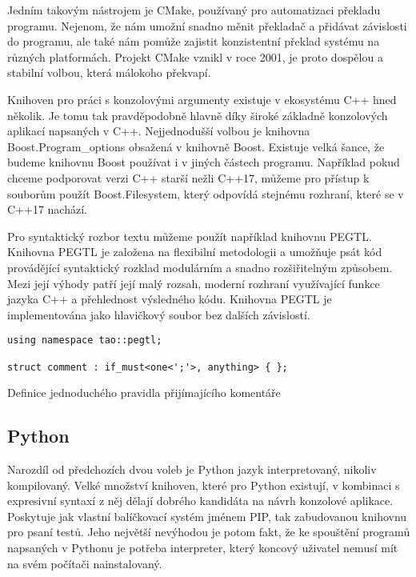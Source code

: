 Jedním takovým nástrojem je CMake\cite{cmake-overview}, používaný pro automatizaci překladu programu. Nejenom, že nám umožní snadno měnit překladač a přidávat závislosti do programu, ale také nám pomůže zajistit konzistentní překlad systému na různých platformách. Projekt CMake vznikl v roce 2001\cite{cmake-overview}, je proto dospělou a stabilní volbou, která málokoho překvapí.

Knihoven pro práci s konzolovými argumenty existuje v ekosystému C++ hned několik. Je tomu tak pravděpodobně hlavně díky široké základně konzolových aplikací napsaných v C++. Nejjednodušší volbou je knihovna Boost.Program\_options obsažená v knihovně Boost\cite{boost-filesystem}. Existuje velká šance, že budeme knihovnu Boost používat i v jiných částech programu. Například  pokud chceme podporovat verzi C++ starší nežli C++17\cite{cpp-filesystem}, můžeme pro přístup k souborům použít Boost.Filesystem, který odpovídá stejnému rozhraní, které se v C++17 nachází\cite{boost-filesystem}.

Pro syntaktický rozbor textu můžeme použít například knihovnu PEGTL\cite{github-pegtl}. Knihovna PEGTL je založena na flexibilní metodologii a umožňuje psát kód provádějící syntaktický rozklad modulárním a snadno rozšiřitelným způsobem. Mezi její výhody patří její malý rozsah, moderní rozhraní využívající funkce jazyka C++ a přehlednost výsledného kódu. Knihovna PEGTL je implementována jako hlavičkový soubor bez dalších závislostí\cite{github-pegtl}.

\begin{listing}
\begin{verbatim}
using namespace tao::pegtl;

struct comment : if_must<one<';'>, anything> { };
\end{verbatim}
\caption{Definice jednoduchého pravidla přijímajícího komentáře}
\label{fig:peg-example}
\end{listing}

\subsection{Python}

Narozdíl od předchozích dvou voleb je Python jazyk interpretovaný, nikoliv kompilovaný. Velké množství knihoven, které pro Python existují, v kombinaci s expresivní syntaxí z něj dělají dobrého kandidáta na návrh konzolové aplikace. Poskytuje jak vlastní balíčkovací systém jménem PIP\cite{pip}, tak zabudovanou knihovnu pro psaní testů\cite{python-unittest}. Jeho největší nevýhodou je potom fakt, že ke spouštění programů napsaných v Pythonu je potřeba interpreter, který koncový uživatel nemusí mít na svém počítači nainstalovaný.

